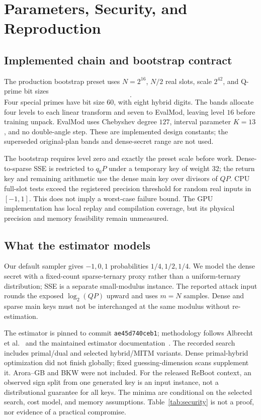 \section{Parameters, Security, and Reproduction}
\label{app:params}
\subsection{Implemented chain and bootstrap contract}
The production bootstrap preset uses $N=2^{16}$, $N/2$ real slots, scale $2^{42}$, and Q-prime bit sizes
\begin{equation*}
 [54,\underbrace{42,\ldots,42}_{16},\underbrace{34,\ldots,34}_{4},
 \underbrace{58,\ldots,58}_{7},\underbrace{56,\ldots,56}_{4}].
\end{equation*}
Four special primes have bit size $60$, with eight hybrid digits. The bands allocate four levels to each linear transform and seven to EvalMod, leaving level $16$ before training unpack. EvalMod uses Chebyshev degree $127$, interval parameter $K=13$, and no double-angle step. These are implemented design constants; the superseded original-plan bands and dense-secret range are not used.

The bootstrap requires level zero and exactly the preset scale before work. Dense-to-sparse SSE is restricted to $q_0P$ under a temporary key of weight $32$; the return key and remaining arithmetic use the dense main key over divisors of $QP$. CPU full-slot tests exceed the registered precision threshold for random real inputs in $[-1,1]$. This does not imply a worst-case failure bound. The GPU implementation has local replay and compilation coverage, but its physical precision and memory feasibility remain unmeasured.

\subsection{What the estimator models}
Our default sampler gives $-1,0,1$ probabilities $1/4,1/2,1/4$. We model the dense secret with a fixed-count sparse-ternary proxy rather than a uniform-ternary distribution; SSE is a separate small-modulus instance. The reported attack input rounds the exposed $\log_2(QP)$ upward and uses $m=N$ samples. Dense and sparse main keys must not be interchanged at the same modulus without re-estimation.

The estimator is pinned to commit \texttt{ae45d740ceb1}; methodology follows Albrecht et al.~\cite{albrecht2015} and the maintained estimator documentation~\cite{latticeEstimator}. The recorded search includes primal/dual and selected hybrid/MITM variants. Dense primal-hybrid optimization did not finish globally; fixed guessing-dimension scans supplement it. Arora--GB and BKW were not included. For the released ReBoot context, an observed sign split from one generated key is an input instance, not a distributional guarantee for all keys. The minima are conditional on the selected search, cost model, and memory assumptions. Table~\ref{tab:security} is not a proof, nor evidence of a practical compromise.

